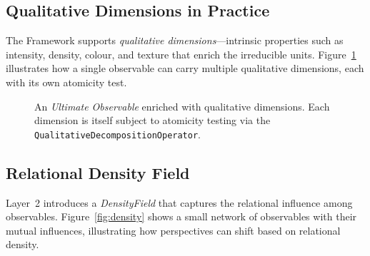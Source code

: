 \subsection{Qualitative Dimensions in Practice}

The \Apeiron{} Framework supports \textit{qualitative dimensions}---intrinsic properties such as intensity, density, colour, and texture that enrich the irreducible units. Figure~\ref{fig:qualitative} illustrates how a single observable can carry multiple qualitative dimensions, each with its own atomicity test.

\begin{figure}[htbp]
    \centering
    \caption{An \textit{Ultimate Observable} enriched with qualitative dimensions. Each dimension is itself subject to atomicity testing via the \texttt{QualitativeDecompositionOperator}.}
    \label{fig:qualitative}
\end{figure}

\subsection{Relational Density Field}

Layer~2 introduces a \textit{DensityField} that captures the relational influence among observables. Figure~\ref{fig:density} shows a small network of observables with their mutual influences, illustrating how perspectives can shift based on relational density.

